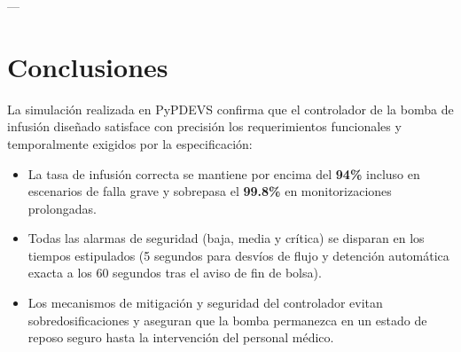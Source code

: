 \documentclass[11pt,a4paper]{article}
\begin{document}
---

\section{Conclusiones}
La simulación realizada en PyPDEVS confirma que el controlador de la bomba de infusión diseñado satisface con precisión los requerimientos funcionales y temporalmente exigidos por la especificación:
\begin{itemize}
    \item La tasa de infusión correcta se mantiene por encima del \textbf{94\%} incluso en escenarios de falla grave y sobrepasa el \textbf{99.8\%} en monitorizaciones prolongadas.
    \item Todas las alarmas de seguridad (baja, media y crítica) se disparan en los tiempos estipulados (5 segundos para desvíos de flujo y detención automática exacta a los 60 segundos tras el aviso de fin de bolsa).
    \item Los mecanismos de mitigación y seguridad del controlador evitan sobredosificaciones y aseguran que la bomba permanezca en un estado de reposo seguro hasta la intervención del personal médico.
\end{itemize}
\end{document}
